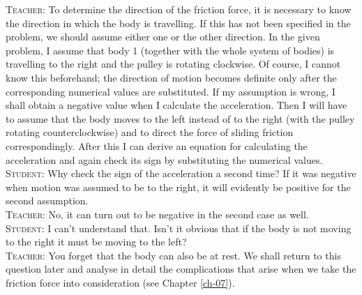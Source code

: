 \documentclass[a4paper,sfsidenotes]{tufte-book}
\begin{document}
\textsc{Teacher:} To determine the direction of the friction force, it is necessary to know the direction in which the body is travelling. If this has not been specified in the problem, we should assume either one or the other direction. In the given problem, I assume that body 1 (together with the whole
system of bodies) is travelling to the right and the pulley is rotating clockwise. Of course, I cannot know this beforehand; the direction of motion becomes definite only after the corresponding numerical values are substituted. If my assumption is wrong, I shall obtain a negative value when I calculate the acceleration. Then I will have to assume that the body moves to the left instead of to the right (with the pulley rotating counterclockwise) and to direct the force of sliding friction correspondingly. After this I can derive an equation for calculating the acceleration and again check its sign by substituting the numerical values. 
\\
\textsc{Student:} Why check the sign of the acceleration a second time? If it was negative when motion was assumed to be to the right, it will evidently be positive for the second assumption.
\\
\textsc{Teacher:} No, it can turn out to be negative in the second case as well.
\\
\textsc{Student:} I can't understand that. Isn't it obvious that if the body is not moving to the right it must be moving to the left?
\\
\textsc{Teacher:} You forget that the body can also be at rest. We shall return to this question later and analyse in detail the complications that arise when we take the friction force into
consideration (see  Chapter \ref{ch-07}).
\end{document}
